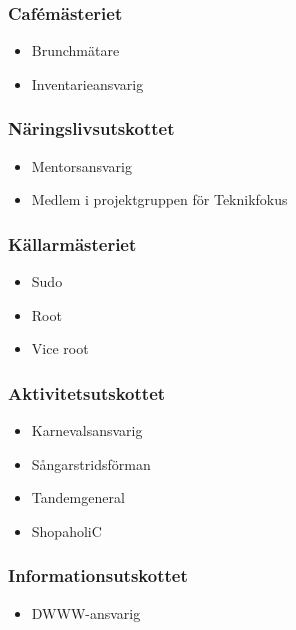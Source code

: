 \documentclass{dsekprotokoll}
\begin{document}
\begin{multicols}{2}

    \subsubsection*{Cafémästeriet}
    \begin{itemize}
        \item Brunchmätare
        \item Inventarieansvarig
    \end{itemize}

    \subsubsection*{Näringslivsutskottet}
    \begin{itemize}
        \item Mentorsansvarig
        \item Medlem i projektgruppen för Teknikfokus
    \end{itemize}

    \subsubsection*{Källarmästeriet}
    \begin{itemize}
        \item Sudo
        \item Root
        \item Vice root
    \end{itemize}

    \subsubsection*{Aktivitetsutskottet}
    \begin{itemize}
        \item Karnevalsansvarig
        \item Sångarstridsförman
        \item Tandemgeneral
        \item ShopaholiC
    \end{itemize}

    \subsubsection*{Informationsutskottet}
    \begin{itemize}
        \item DWWW-ansvarig
    \end{itemize}


\end{multicols}
\end{document}
